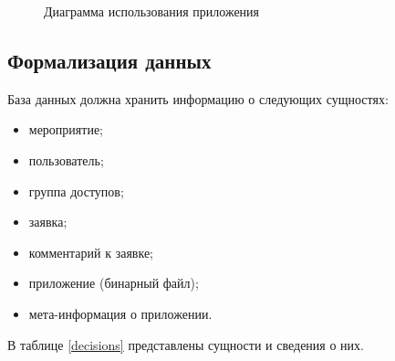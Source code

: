 \begin{figure}[h!]
	\caption{Диаграмма использования приложения}
	\label{fig:UseCase}
\end{figure}

\subsection{Формализация данных}

База данных должна хранить информацию о следующих сущностях:

\begin{itemize}[label=---]
	\item мероприятие;
	\item пользователь;
	\item группа доступов;
	\item заявка;
	\item комментарий к заявке;
	\item приложение (бинарный файл);
	\item мета-информация о приложении.
\end{itemize}


В таблице \ref{decisions} представлены сущности и сведения о них.

